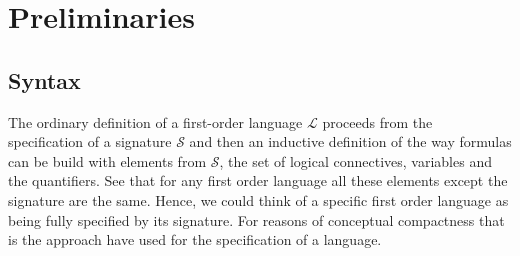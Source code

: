 \chapter{Preliminaries}
\section{Syntax}
The ordinary definition of a first-order language $\mathcal{L}$ proceeds from the specification of a signature $\mathcal{S}$ and then an inductive definition of the way formulas can be build with elements from $\mathcal{S}$, the set of logical connectives, variables and the quantifiers. See that for any first order language all these elements except the signature are the same. Hence, we could think of a specific first order language as being fully specified by its signature. For reasons of conceptual compactness that is the approach \cite{ffl} have used for the specification of a language.



